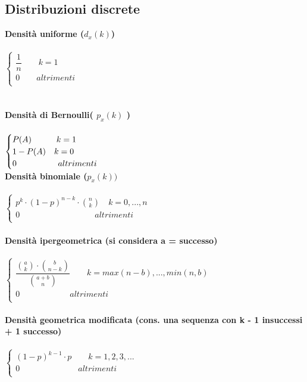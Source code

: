 \subsection{Distribuzioni discrete}
\textbf{Densità uniforme ($d_{x}(k)$)} \\ \\
$
\begin{cases}
	\dfrac{1}{n}\qquad  k = 1 \\  
	0\qquad			 altrimenti \\
\end{cases}
$	\\ \\ \\
\textbf{Densità di Bernoulli( $p_{x}(k)$ )} \\ \\
$
\begin{cases}
	P(A)\qquad\quad  	k = 1 \\  
	1 - P(A)\quad	k = 0 \\
	0\qquad\qquad\quad		altrimenti
\end{cases} \\
$ \\ 

\textbf{Densità binomiale ($p_{x}(k))$} \\ \\
$
\begin{cases}
	p^{k} \cdot(1-p)^{n - k} \cdot \binom{n}{k}\quad  k = 0,...,n \\  
	0\qquad\qquad\qquad\qquad\quad		 altrimenti \\
\end{cases}
$ \\ \\		

\textbf{Densità ipergeometrica (si considera a = successo)} \\ \\
$
\begin{cases}
	\dfrac{\binom{a}{k} \cdot \binom{b}{n - k}}{ \binom{a + b}{n}}\qquad  k = max(n - b), ..., min(n, b) \\  
	0\qquad\qquad\qquad			 altrimenti \\
\end{cases}
$ \\ \\	

\textbf{Densità geometrica modificata (cons. una sequenza con k - 1 insuccessi + 1 successo)} \\ \\
$
\begin{cases}
	(1 - p)^{k - 1} \cdot p\qquad  k = 1,2,3,... \\  
	0\qquad\qquad\qquad\quad			 altrimenti \\
\end{cases}
$ \\ \\	

